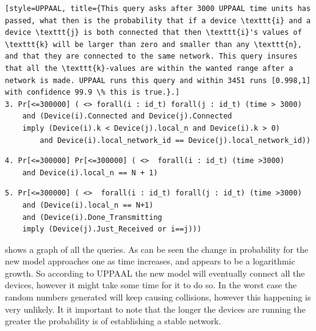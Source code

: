 \begin{lstlisting}[style=UPPAAL, title={This query asks after 3000 UPPAAL time units has passed, what then is the probability that if a device \texttt{i} and a device \texttt{j} is both connected that then \texttt{i}'s values of \texttt{k} will be larger than zero and smaller than any \texttt{n}, and that they are connected to the same network. This query insures that all the \texttt{k}-values are within the wanted range after a network is made. UPPAAL runs this query and within 3451 runs [0.998,1] with confidence 99.9 \% this is true.}.]
3. Pr[<=300000] ( <> forall(i : id_t) forall(j : id_t) (time > 3000) 
    and (Device(i).Connected and Device(j).Connected 
    imply (Device(i).k < Device(j).local_n and Device(i).k > 0) 
        and Device(i).local_network_id == Device(j).local_network_id))

\end{lstlisting}

\begin{lstlisting}[style=UPPAAL, title={This query asks after 3000 UPPAAL time units has passed, what then is the probability that a device \texttt{i} has a local value of \texttt{n} to be equal to the number of devices plus the the empty slot, which is \texttt{N} + 1, which means that all devices are in the same network. UPPAAL runs this query and within 3451 runs [0.998,1] with confidence 99.9 \% this is true.}]
4. Pr[<=300000] Pr[<=300000] ( <>  forall(i : id_t) (time >3000) 
    and Device(i).local_n == N + 1)
\end{lstlisting}

\begin{lstlisting}[style=UPPAAL, title={This query is a generalisation of the previous which includes a check of whether when one device finish transmitting then the rest are just finished receiving. UPPAAL runs this query and within 3451 runs [0.998,1] with confidence 99.9 \% this is true.}]
5. Pr[<=300000] ( <>  forall(i : id_t) forall(j : id_t) (time >3000) 
    and (Device(i).local_n == N+1) 
    and (Device(i).Done_Transmitting 
    imply (Device(j).Just_Received or i==j)))
\end{lstlisting}

\noindent
{} shows a graph of all the queries.
As can be seen the change in probability for the new model approaches one as time increases, and appears to be a logarithmic growth.
So according to UPPAAL the new model will eventually connect all the devices, however it might take some time for it to do so.
In the worst case the random numbers generated will keep causing collisions, however this happening is very unlikely. 
It it important to note that the longer the devices are running the greater the probability is of establishing a stable network.


